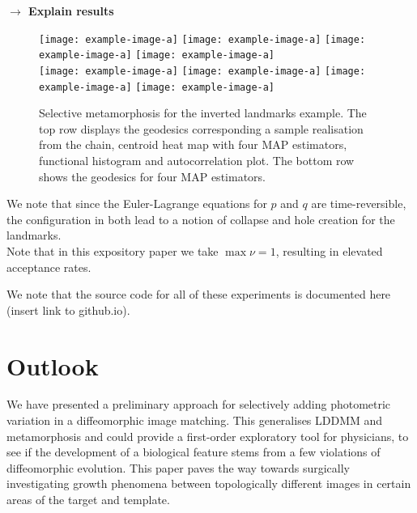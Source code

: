 \documentclass[runningheads]{llncs}
\begin{document}
\textbf{$\longrightarrow$ Explain results}\\

\begin{figure}
\centering
\begin{minipage}{\textwidth}
  \centering
    \texttt{[image: example-image-a]}\quad
    \texttt{[image: example-image-a]}\quad
    \texttt{[image: example-image-a]}\quad
    \texttt{[image: example-image-a]}\\[0.25cm]
    \texttt{[image: example-image-a]}\quad
    \texttt{[image: example-image-a]}\quad
    \texttt{[image: example-image-a]}\quad
    \texttt{[image: example-image-a]}
    \caption{Selective metamorphosis for the inverted landmarks example. The top
    row displays the geodesics corresponding a sample realisation from the
    chain, centroid heat map with four MAP estimators, functional histogram and
    autocorrelation plot. The bottom row shows the geodesics for four MAP
    estimators.}
    \label{fig:selective:triangle}
\end{minipage}
\end{figure}

We note that since the Euler-Lagrange equations for $p$ and $q$ are
time-reversible, the configuration in both lead to a notion of
collapse and hole creation for the landmarks.\\

Note that in this expository paper we take $\max \nu = 1$, resulting in
elevated acceptance rates.

We note that the source code for all of these experiments is documented
here (insert link to github.io).

\section{Outlook}\label{sec:outlook}

We have presented a preliminary approach for selectively adding photometric
variation in a diffeomorphic image matching. This generalises LDDMM and
metamorphosis and  could provide a first-order exploratory tool for physicians,
to see if the development of a biological feature stems from a few violations of
diffeomorphic evolution. This paper paves the way towards surgically
investigating growth phenomena between topologically different images in certain
areas of the target and template.\\
\end{document}
